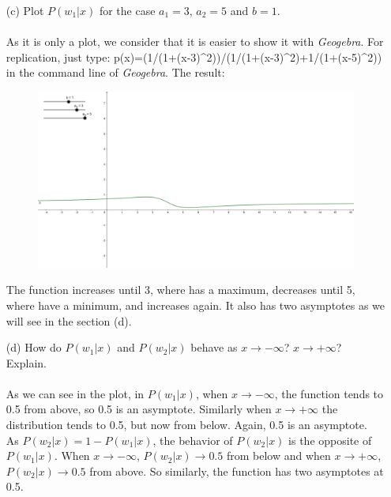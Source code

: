 \documentclass[10pt]{article}
\begin{document}
\begin{enumerate}
\Large
  \item[(c)] Plot $P(w_1|x)$ for the case $a_1=3$, $a_2=5$ and $b=1$.\\ \ \\
\normalsize
As it is only a plot, we consider that it is easier to show it with \textit{Geogebra}. For replication, just type: p(x)=(1/(1+(x-3)\^{}2))/(1/(1+(x-3)\^{}2)+1/(1+(x-5)\^{}2)) in the command line of \textit{Geogebra}. The result:
\begin{figure}[h]
\centering
\includegraphics[scale=0.4]{7c}
\end{figure}
The function increases until 3, where has a maximum, decreases until 5, where have a minimum, and increases again. It also has two asymptotes as we will see in the section (d). \\ 
\Large
  \item[(d)] How do $P(w_1|x)$ and $P(w_2|x)$ behave as $x \rightarrow -\infty$? $x \rightarrow +\infty$? Explain.\\ \ \\
\normalsize
As we can see in the plot, in $P(w_1|x)$, when $x \rightarrow -\infty$, the function tends to 0.5 from above, so 0.5 is an asymptote. Similarly when $x \rightarrow +\infty$ the distribution tends to 0.5, but now from below. Again, 0.5 is an asymptote. \\ 

As $P(w_2|x)=1-P(w_1|x)$, the behavior of $P(w_2|x)$ is the opposite of $P(w_1|x)$. When $x \rightarrow -\infty$, $P(w_2|x)\rightarrow 0.5$ from below and when $x \rightarrow +\infty$, $P(w_2|x)\rightarrow 0.5$ from above. So similarly, the function has two asymptotes at 0.5. \\


\end{enumerate}
\end{document}
